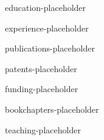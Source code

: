 


\geometry{top=1in, bottom=1in, left=1in, right=1in}

\hypersetup{colorlinks=true, allcolors=secondaryColor}



\centerline{}


{{education-placeholder}}



{{experience-placeholder}}



{{publications-placeholder}}



{{patents-placeholder}}



{{funding-placeholder}}



{{bookchapters-placeholder}}



{{teaching-placeholder}}


